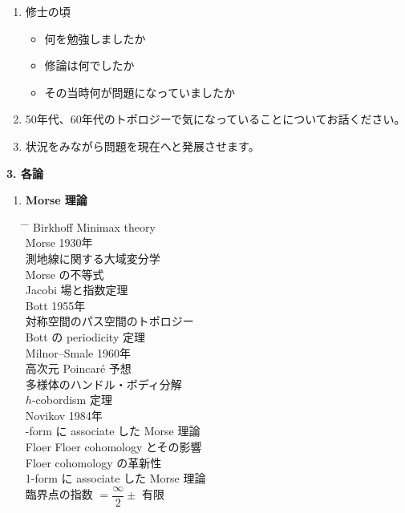 \documentclass[uplatex,dvipdfmx]{jlreq}
\begin{document}
\begin{enumerate}
  \item 修士の頃
        \begin{itemize}
          \item 何を勉強しましたか
          \item 修論は何でしたか
          \item その当時何が問題になっていましたか
        \end{itemize}
  \item 50年代、60年代のトポロジーで気になっていることについてお話ください。
  \item 状況をみながら問題を現在へと発展させます。
\end{enumerate}

\bigskip
\noindent\textbf{3. 各論}

\begin{enumerate}
  \item \textbf{Morse 理論}

  \begin{tabbing}
    \hspace{1cm} \= \hspace{3cm} \= \hspace{8cm} \kill
    \> Birkhoff \> Minimax theory \\
    \> Morse \> 1930年 \\
    \> \> 測地線に関する大域変分学 \\
    \> \> Morse の不等式 \\
    \> \> Jacobi 場と指数定理 \\
    \> Bott \> 1955年 \\
    \> \> 対称空間のパス空間のトポロジー \\
    \> \> Bott の periodicity 定理 \\
    \> Milnor--Smale \> 1960年 \\
    \> \> 高次元 Poincaré 予想 \\
    \> \> 多様体のハンドル・ボディ分解 \\
    \> \> $h$-cobordism 定理 \\
    \> Novikov \> 1984年 \\
    \> -form に associate した Morse 理論 \\
    \> Floer \> Floer cohomology とその影響 \\
    \> \> Floer cohomology の革新性 \\
    \> \> \hspace{1cm}1-form に associate した Morse 理論 \\
    \> \> \hspace{1cm}臨界点の指数 $= \dfrac{\infty}{2} \pm$ 有限
  \end{tabbing}


\end{enumerate}
\end{document}
